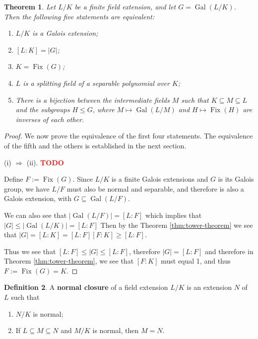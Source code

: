 \documentclass[12pt]{article}
\newtheorem{theorem}{Theorem}
\theoremstyle{definition}
\newtheorem{definition}[theorem]{Definition}
\newcommand{\Gal}{\operatorname{Gal}}
\newcommand{\Fix}{\operatorname{Fix}}
\newcommand{\TODO}{\textbf{\textcolor{red}{TODO}}}
\begin{document}
\begin{theorem} \label{thm:fixed}
    Let $L/K$ be a finite field extension, and let $G = \Gal(L/K)$. Then the following five statements are equivalent:
    \begin{enumerate}[label=(\roman*)]
        \item $L/K$ is a Galois extension;
        \item $[L:K] = |G|$;
        \item $K = \Fix(G)$;
        \item $L$ is a splitting field of a separable polynomial over $K$;
        \item There is a bijection between the intermediate fields $M$ such that $K \subseteq M \subseteq L$ and the subgroups $H \le G$, where $M \mapsto \Gal (L/M)$ and $H \mapsto \Fix(H)$ are inverses of each other.
    \end{enumerate}
\end{theorem}
\begin{proof}
    We now prove the equivalence of the first four statements. The equivalence of the fifth and the others is established in the next section.

    (i) $\Rightarrow$ (ii). \TODO

    Define $F:= \Fix(G)$. Since $L/K$ is a finite Galois extensions and $G$ is its Galois group, we have $L/F$ must also be normal and separable, and therefore is also a Galois extension, with $G \subseteq \Gal(L/F)$.

\noindent We can also see that $|\Gal(L/F)| = [L:F]$ which implies that $|G|\leq|\Gal(L/K)|=[L:F]$
Then by the Theorem \ref{thm:tower-theorem} we see that $|G|=[L:K]=[L:F][F:K]\geq [L:F]$.

Thus we see that $[L:F]\leq|G|\leq[L:F]$, therefore $|G|=[L:F]$ and therefore in Theorem \ref{thm:tower-theorem}, we see that $[F:K]$ must equal 1, and thus $F:=\Fix(G) = K$.
\end{proof}

\begin{definition}
    A \textbf{normal closure} of a field extension $L / K$ is an extension $N$ of $L$ such that 
    \begin{enumerate}
        \item $N / K$ is normal;
        \item If $L \subseteq M \subseteq N$ and $M / K$ is normal, then $M = N$.
    \end{enumerate}
\end{definition}
\end{document}
